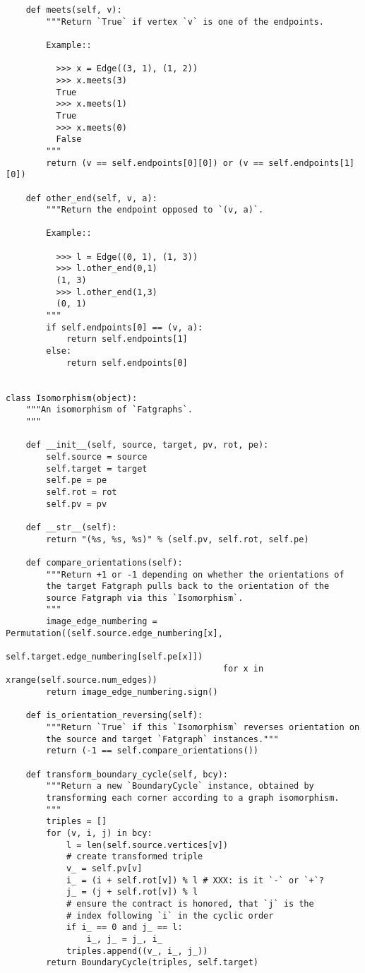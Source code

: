 \begin{lstlisting}
    def meets(self, v):
        """Return `True` if vertex `v` is one of the endpoints.

        Example::

          >>> x = Edge((3, 1), (1, 2))
          >>> x.meets(3)
          True
          >>> x.meets(1)
          True
          >>> x.meets(0)
          False          
        """
        return (v == self.endpoints[0][0]) or (v == self.endpoints[1][0])

    def other_end(self, v, a):
        """Return the endpoint opposed to `(v, a)`.

        Example::

          >>> l = Edge((0, 1), (1, 3))
          >>> l.other_end(0,1)
          (1, 3)
          >>> l.other_end(1,3)
          (0, 1)
        """
        if self.endpoints[0] == (v, a):
            return self.endpoints[1]
        else:
            return self.endpoints[0]


class Isomorphism(object):
    """An isomorphism of `Fatgraphs`.
    """

    def __init__(self, source, target, pv, rot, pe):
        self.source = source
        self.target = target
        self.pe = pe
        self.rot = rot
        self.pv = pv

    def __str__(self):
        return "(%s, %s, %s)" % (self.pv, self.rot, self.pe)

    def compare_orientations(self):
        """Return +1 or -1 depending on whether the orientations of
        the target Fatgraph pulls back to the orientation of the
        source Fatgraph via this `Isomorphism`.
        """
        image_edge_numbering = Permutation((self.source.edge_numbering[x],
                                            self.target.edge_numbering[self.pe[x]])
                                           for x in xrange(self.source.num_edges))
        return image_edge_numbering.sign()

    def is_orientation_reversing(self):
        """Return `True` if this `Isomorphism` reverses orientation on
        the source and target `Fatgraph` instances."""
        return (-1 == self.compare_orientations())

    def transform_boundary_cycle(self, bcy):
        """Return a new `BoundaryCycle` instance, obtained by
        transforming each corner according to a graph isomorphism.
        """
        triples = []
        for (v, i, j) in bcy:
            l = len(self.source.vertices[v])
            # create transformed triple 
            v_ = self.pv[v]
            i_ = (i + self.rot[v]) % l # XXX: is it `-` or `+`?
            j_ = (j + self.rot[v]) % l
            # ensure the contract is honored, that `j` is the
            # index following `i` in the cyclic order
            if i_ == 0 and j_ == l:
                i_, j_ = j_, i_
            triples.append((v_, i_, j_))
        return BoundaryCycle(triples, self.target)




\end{lstlisting}
